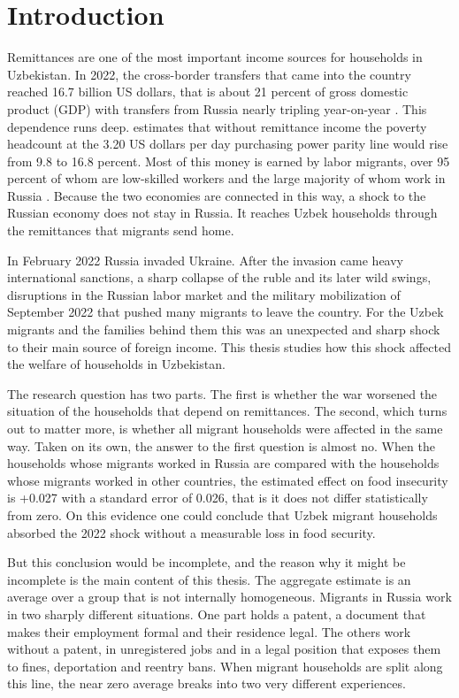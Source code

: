 \section{Introduction}\label{sec:1}

Remittances are one of the most important income sources for households in Uzbekistan. In 2022, the cross-border transfers that came into the country reached 16.7 billion US dollars, that is about 21 percent of gross domestic product (GDP) with transfers from Russia nearly tripling year-on-year \parencite{worldbank2023}. This dependence runs deep. \cite{seitz2019} estimates that without remittance income the poverty headcount at the 3.20 US dollars per day purchasing power parity line would rise from 9.8 to 16.8 percent. Most of this money is earned by labor migrants, over 95 percent of whom are low-skilled workers and the large majority of whom work in Russia \parencite{bossavie2024journey}. Because the two economies are connected in this way, a shock to the Russian economy does not stay in Russia. It reaches Uzbek households through the remittances that migrants send home.

In February 2022 Russia invaded Ukraine. After the invasion came heavy international sanctions, a sharp collapse of the ruble and its later wild swings, disruptions in the Russian labor market and the military mobilization of September 2022 that pushed many migrants to leave the country. For the Uzbek migrants and the families behind them this was an unexpected and sharp shock to their main source of foreign income. This thesis studies how this shock affected the welfare of households in Uzbekistan.

The research question has two parts. The first is whether the war worsened the situation of the households that depend on remittances. The second, which turns out to matter more, is whether all migrant households were affected in the same way. Taken on its own, the answer to the first question is almost no. When the households whose migrants worked in Russia are compared with the households whose migrants worked in other countries, the estimated effect on food insecurity is +0.027 with a standard error of 0.026, that is it does not differ statistically from zero. On this evidence one could conclude that Uzbek migrant households absorbed the 2022 shock without a measurable loss in food security.

But this conclusion would be incomplete, and the reason why it might be incomplete is the main content of this thesis. The aggregate estimate is an average over a group that is not internally homogeneous. Migrants in Russia work in two sharply different situations. One part holds a patent, a document that makes their employment formal and their residence legal. The others work without a patent, in unregistered jobs and in a legal position that exposes them to fines, deportation and reentry bans. When migrant households are split along this line, the near zero average breaks into two very different experiences.


